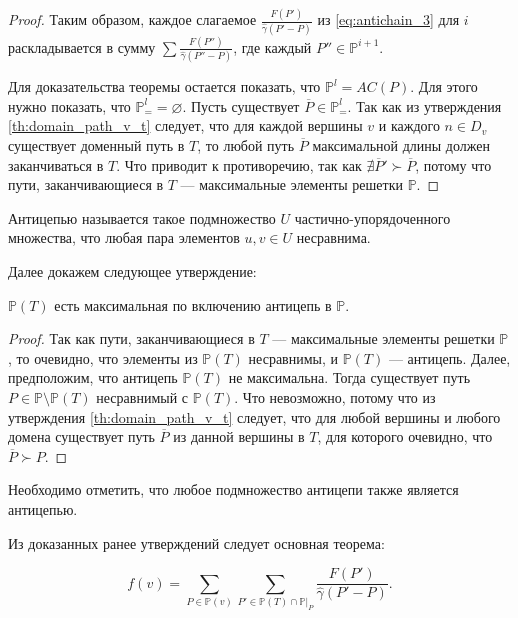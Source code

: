 \documentclass[../thesis.tex]{subfiles}
\begin{document}
\begin{proof}
Таким образом, каждое слагаемое $\frac{F(P')}{\hat{\gamma}(P'-P)}$ из \eqref{eq:antichain_3} для $i$ раскладывается в сумму $\sum{\frac{F(P'')}{\hat{\gamma}(P''-P)}}$, где каждый $P''\in \mathbb{P}^{i+1}$.

Для доказательства теоремы остается показать, что $\mathbb{P}^{l} = AC(P)$.
Для этого нужно показать, что $\mathbb{P}^{l}_{=} = \varnothing$.
Пусть существует $\overline{P}\in \mathbb{P}^{l}_{=}$.
Так как из утверждения \ref{th:domain_path_v_t} следует, что для каждой вершины $v$ и каждого $n\in D_v$ существует доменный путь в $T$, то любой путь $\overline{P}$ максимальной длины должен заканчиваться в $T$.
Что приводит к противоречию, так как $\nexists \overline{P}' \succ \overline{P}$, потому что пути, заканчивающиеся в $T$ --- максимальные элементы решетки $\mathbb{P}$.
\end{proof}

\begin{definition}
Антицепью называется такое подмножество $U$ частично-упорядоченного множества, что любая пара элементов $u, v\in U$ несравнима.
\end{definition}

Далее докажем следующее утверждение:

\begin{proposition}
$\mathbb{P}(T)$ есть максимальная по включению антицепь в $\mathbb{P}$.
\end{proposition}

\begin{proof}
Так как пути, заканчивающиеся в $T$ --- максимальные элементы решетки $\mathbb{P}$, то очевидно, что элементы из $\mathbb{P}(T)$ несравнимы, и $\mathbb{P}(T)$ --- антицепь.
Далее, предположим, что антицепь $\mathbb{P}(T)$ не максимальна.
Тогда существует путь $P\in \mathbb{P}\setminus \mathbb{P}(T)$ несравнимый с $\mathbb{P}(T)$.
Что невозможно, потому что из утверждения \ref{th:domain_path_v_t} следует, что для любой вершины и любого домена существует путь $\overline{P}$ из данной вершины в $T$, для которого очевидно, что $\overline{P} \succ P$.
\end{proof}

Необходимо отметить, что любое подмножество антицепи также является антицепью.

Из доказанных ранее утверждений следует основная теорема:

\begin{theorem} \label{th:flow_decomposition}
\begin{equation} \label{eq:flow_decomposition}
    f(v) = \sum_{P\in \mathbb{P}(v)}{ \sum_{P'\in \mathbb{P}(T)\cap \mathbb{P}|_P}{ \frac{F(P')}{\hat{\gamma}(P'-P)} } }.
\end{equation}
\end{theorem}
\end{document}
